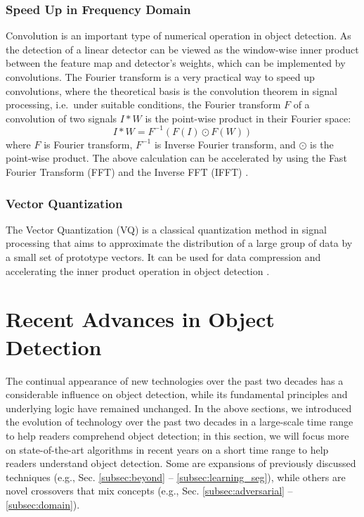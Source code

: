 \documentclass[lettersize,journal]{IEEEtran}
\begin{document}
\subsubsection{Speed Up in Frequency Domain}

Convolution is an important type of numerical operation in object detection. As the detection of a linear detector can be viewed as the window-wise inner product between the feature map and detector's weights, which can be implemented by convolutions. The Fourier transform is a very practical way to speed up convolutions, where the theoretical basis is the convolution theorem in signal processing, i.e.\, under suitable conditions, the Fourier transform $F$ of a convolution of two signals $I*W$ is the point-wise product in their Fourier space:
\begin{equation}
I*W = F^{-1}(F(I) \odot F(W))
\end{equation}
where $F$ is Fourier transform, $F^{-1}$ is Inverse Fourier transform, and $\odot$ is the point-wise product. The above calculation can be accelerated by using the Fast Fourier Transform (FFT) and the Inverse FFT (IFFT) \cite{ICLR14-CNNFFT, ECML17-CNNFFT, arXiv14-FBFFT, NIPS15-SpectralCNN}.

\subsubsection{Vector Quantization}

The Vector Quantization (VQ) is a classical quantization method in signal processing that aims to approximate the distribution of a large group of data by a small set of prototype vectors. It can be used for data compression and accelerating the inner product operation in object detection \cite{NIPS13-VQ, ECCV12-VQ}. 


\section{Recent Advances in Object Detection}\label{sec:recent-advances}

The continual appearance of new technologies over the past two decades has a considerable influence on object detection, while its fundamental principles and underlying logic have remained unchanged. In the above sections, we introduced the evolution of technology over the past two decades in a large-scale time range to help readers comprehend object detection; in this section, we will focus more on state-of-the-art algorithms in recent years on a short time range to help readers understand object detection. Some are expansions of previously discussed techniques (e.g., Sec. \ref{subsec:beyond} -- \ref{subsec:learning_seg}), while others are novel crossovers that mix concepts (e.g., Sec. \ref{subsec:adversarial} -- \ref{subsec:domain}).
\end{document}
